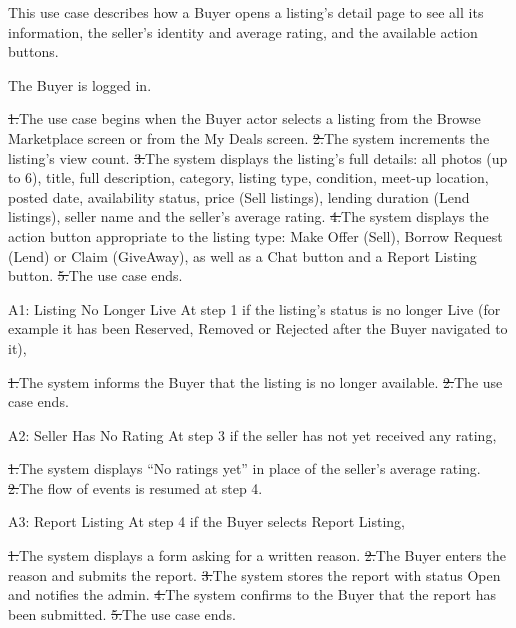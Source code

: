 This use case describes how a Buyer opens a listing's detail page to see all its information, the seller's identity and average rating, and the available action buttons.\par
{}
The Buyer is logged in.\par
{}
\st{1.}{The use case begins when the Buyer actor selects a listing from the Browse Marketplace screen or from the My Deals screen.}
\st{2.}{The system increments the listing's view count.}
\st{3.}{The system displays the listing's full details: all photos (up to 6), title, full description, category, listing type, condition, meet-up location, posted date, availability status, price (Sell listings), lending duration (Lend listings), seller name and the seller's average rating.}
\st{4.}{The system displays the action button appropriate to the listing type: Make Offer (Sell), Borrow Request (Lend) or Claim (GiveAway), as well as a Chat button and a Report Listing button.}
\st{5.}{The use case ends.}
\begin{flowblock}{A1: Listing No Longer Live}
At step 1 if the listing's status is no longer Live (for example it has been Reserved, Removed or Rejected after the Buyer navigated to it),\par
\st{1.}{The system informs the Buyer that the listing is no longer available.}
\st{2.}{The use case ends.}
\end{flowblock}
\begin{flowblock}{A2: Seller Has No Rating}
At step 3 if the seller has not yet received any rating,\par
\st{1.}{The system displays ``No ratings yet'' in place of the seller's average rating.}
\st{2.}{The flow of events is resumed at step 4.}
\end{flowblock}
\begin{flowblock}{A3: Report Listing}
At step 4 if the Buyer selects Report Listing,\par
\st{1.}{The system displays a form asking for a written reason.}
\st{2.}{The Buyer enters the reason and submits the report.}
\st{3.}{The system stores the report with status Open and notifies the admin.}
\st{4.}{The system confirms to the Buyer that the report has been submitted.}
\st{5.}{The use case ends.}
\end{flowblock}

